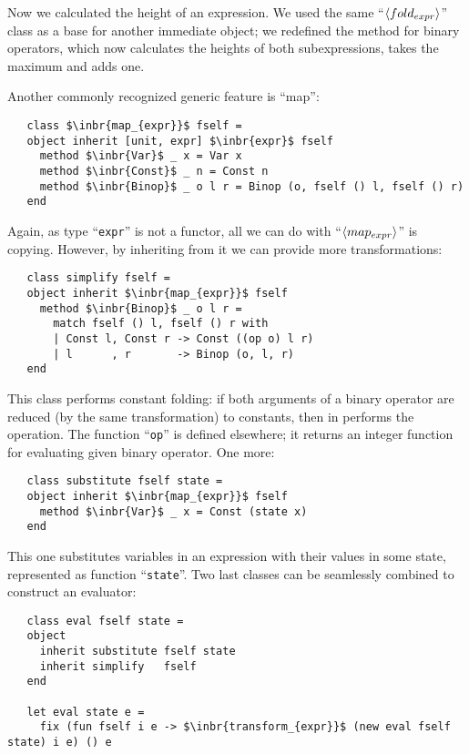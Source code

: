 Now we calculated the height of an expression. We used the same ``$\left<fold_{expr}\right>$'' class as a base for another immediate object; we redefined the method for
binary operators, which now calculates the heights of both subexpressions, takes the maximum and adds one. 

Another commonly recognized generic feature is ``map'':

\begin{lstlisting}
   class $\inbr{map_{expr}}$ fself =
   object inherit [unit, expr] $\inbr{expr}$ fself
     method $\inbr{Var}$ _ x = Var x
     method $\inbr{Const}$ _ n = Const n
     method $\inbr{Binop}$ _ o l r = Binop (o, fself () l, fself () r)
   end
\end{lstlisting}

Again, as type ``\lstinline{expr}'' is not a functor, all we can do with ``$\left<map_{expr}\right>$'' is copying. However, by inheriting from it we
can provide more transformations:

\begin{lstlisting}
   class simplify fself =
   object inherit $\inbr{map_{expr}}$ fself
     method $\inbr{Binop}$ _ o l r =
       match fself () l, fself () r with
       | Const l, Const r -> Const ((op o) l r)
       | l      , r       -> Binop (o, l, r)     
   end
\end{lstlisting}

This class performs constant folding: if both arguments of a binary operator are reduced (by the same transformation) to constants, then in
performs the operation. The function ``\lstinline{op}'' is defined elsewhere; it returns an integer function for evaluating given binary operator. One more:


\begin{lstlisting}
   class substitute fself state =
   object inherit $\inbr{map_{expr}}$ fself
     method $\inbr{Var}$ _ x = Const (state x)  
   end
\end{lstlisting}

This one substitutes variables in an expression with their values in some state, represented as function ``\lstinline{state}''. Two last
classes can be seamlessly combined to construct an evaluator:

\begin{lstlisting}
   class eval fself state =
   object
     inherit substitute fself state
     inherit simplify   fself
   end

   let eval state e =
     fix (fun fself i e -> $\inbr{transform_{expr}}$ (new eval fself state) i e) () e  
\end{lstlisting}

